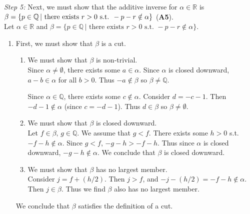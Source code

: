 \documentclass[../main.tex]{subfiles}
\begin{document}
\emph{Step 5:} Next, we must show that the additive inverse for \( \alpha \in \mathbb{R} \) is
\( \beta = \{ p \in \mathbb{Q} \, | \text{ there exists } \\ r > 0 \text{ s.t. } -p-r \notin \alpha \} \) (\textbf{A5}). \\
Let \( \alpha \in \mathbb{R} \) and \( \beta = \{ p \in \mathbb{Q} \, | \text{ there exists } r > 0 \text{ s.t. } -p-r \notin \alpha \} \).
\begin{enumerate}
    \item First, we must show that \( \beta \) is a cut.
    \begin{enumerate}[label=\roman*.]
        \item We must show that \( \beta \) is non-trivial. \\
        Since \( \alpha \neq \emptyset \), there exists some \( a \in \alpha \).
        Since \( \alpha \) is closed downward, \( a-b \in \alpha \) for all \( b > 0 \).
        Thus \( -a \notin \beta \) so \( \beta \neq \mathbb{Q} \).

        Since \( \alpha \in \mathbb{Q}\), there exists some \( c \notin \alpha \).
        Consider \( d = -c-1 \). Then \( -d-1 \notin \alpha \) (since \( c = -d -1 \)).
        Thus \( d \in \beta \) so \( \beta \neq \emptyset \).

        \item We must show that \( \beta \) is closed downward. \\
        Let \( f \in \beta, \, g \in \mathbb{Q} \). We assume that \( g < f \).
        There exists some \( h > 0 \) s.t. \( -f-h \notin \alpha \).
        Since \( g < f \), \( -g-h > -f-h \). Thus since \( \alpha \) is closed downward, \( -g-h \notin \alpha \).
        We conclude that \( \beta \) is closed downward.

        \item We must show that \( \beta \) has no largest member. \\
        Consider \( j = f + (h/2) \). Then \( j > f \), and \( -j - (h/2) = -f - h \notin \alpha \). Then \( j \in \beta \).
        Thus we find \( \beta \) also has no largest member.
    \end{enumerate}
    We conclude that \( \beta \) satisfies the definition of a cut.


\end{enumerate}
\end{document}
